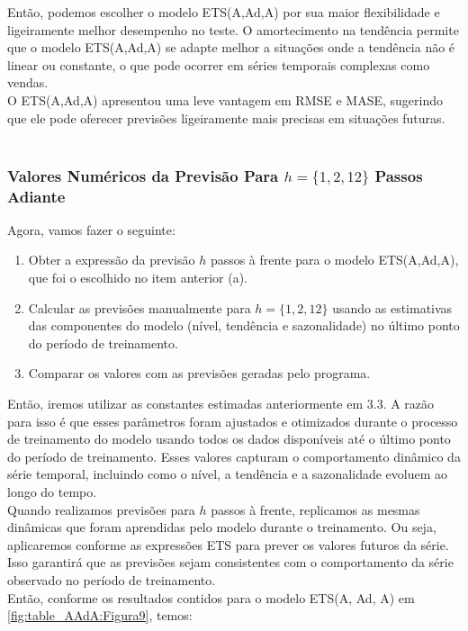 \documentclass[a4paper, 12pt]{article}
\begin{document}
Então, podemos escolher o modelo ETS(A,Ad,A) por sua maior flexibilidade e ligeiramente melhor desempenho no teste. O amortecimento na tendência permite que o modelo ETS(A,Ad,A) se adapte melhor a situações onde a tendência não é linear ou constante, o que pode ocorrer em séries temporais complexas como vendas.\\
O ETS(A,Ad,A) apresentou uma leve vantagem em RMSE e MASE, sugerindo que ele pode oferecer previsões ligeiramente mais precisas em situações futuras.\\\\


\subsubsection{Valores Numéricos da Previsão Para $h=\{1,2,12\}$ Passos Adiante}

Agora, vamos fazer o seguinte:

\begin{enumerate}
    \item Obter a expressão da previsão $h$ passos à frente para o modelo ETS(A,Ad,A), que foi o escolhido no item anterior (a).
    \item Calcular as previsões manualmente para $h= \{ 1,2,12  \}$ usando as estimativas das componentes do modelo (nível, tendência e sazonalidade) no último ponto do período de treinamento. 
    \item Comparar os valores com as previsões geradas pelo programa.
\end{enumerate}

Então, iremos utilizar as constantes estimadas anteriormente em 3.3. A razão para isso é que esses parâmetros foram ajustados e otimizados durante o processo de treinamento do modelo usando todos os dados disponíveis até o último ponto do período de treinamento. Esses valores capturam o comportamento dinâmico da série temporal, incluindo como o nível, a tendência e a sazonalidade evoluem ao longo do tempo.\\

Quando realizamos previsões para $h$ passos à frente, replicamos as mesmas dinâmicas que foram aprendidas pelo modelo durante o treinamento. Ou seja, aplicaremos conforme as expressões ETS para prever os valores futuros da série. Isso garantirá que as previsões sejam consistentes com o comportamento da série observado no período de treinamento.\\

Então, conforme os resultados contidos para o modelo ETS(A, Ad, A) em \ref{fig:table_AAdA:Figura9}, temos:\\
\end{document}
